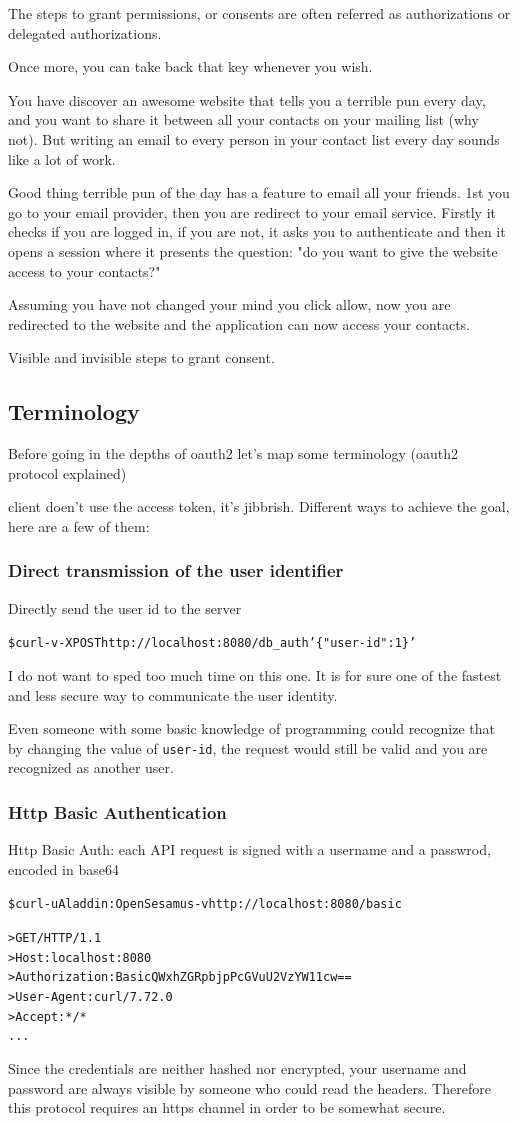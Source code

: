 \documentclass[20pt]{style}
\begin{document}
The steps to grant permissions, or consents are often referred as authorizations
or delegated authorizations.

Once more, you can take back that key whenever you wish.

You have discover an awesome website that tells you a terrible pun every day,
and you want to share it between all your contacts on your mailing list (why
not).
But writing an email to every person in your contact list every day sounds like
a lot of work.

Good thing terrible pun of the day has a feature to email all your friends.
1st you go to your email provider, then you are redirect to your email service.
Firstly it checks if you are logged in, if you are not, it asks you to
authenticate and then it opens a session where it presents the question: "do you
want to give the website access to your contacts?"

Assuming you have not changed your mind you click allow, now you are redirected
to the website and the application can now access your contacts.

Visible and invisible steps to grant consent.
\subsection{Terminology}
Before going in the depths of oauth2 let's map some terminology
(oauth2 protocol explained)

client doen't use the access token, it's jibbrish.
Different ways to achieve the goal, here are a few of them:
\subsubsection{Direct transmission of the user identifier}
Directly send the user id to the server
\begin{alltt}
    \$ curl -v -X POST http://localhost:8080/db_auth '\{"user-id": 1\}'
\end{alltt}
I do not want to sped too much time on this one. It is for sure one of the
fastest
and less secure way to communicate the user identity.

Even someone with some basic knowledge of programming could recognize that by changing the
value of \texttt{user-id}, the request would still be valid and you are recognized as
another user.

\subsubsection{Http Basic Authentication}
Http Basic Auth: each API request is signed with a username and a passwrod, encoded in base64
\begin{alltt}
    \$ curl -u Aladdin:OpenSesamus -v http://localhost:8080/basic

    > GET / HTTP/1.1
    > Host: localhost:8080
    > Authorization: Basic QWxhZGRpbjpPcGVuU2VzYW11cw==
    > User-Agent: curl/7.72.0
    > Accept: */*
    ...
\end{alltt}
Since the credentials are neither hashed nor encrypted, your username and password are always visible by
someone who could read the headers.
Therefore this protocol requires an https channel in order to be somewhat secure.
\end{document}
